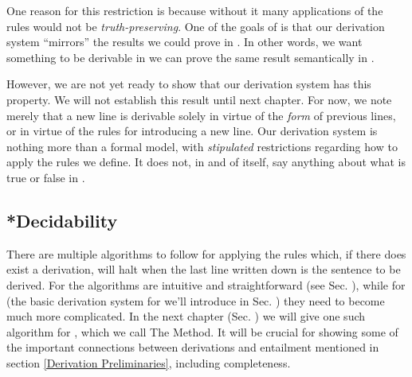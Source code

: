 One reason for this restriction is because without it many applications of the rules would not be \emph{truth-preserving}.  One of the goals of \GSD{} is that our derivation system ``mirrors'' the results we could prove in \GSL{}.  In other words, we want something to be derivable in \GSD{} \Iff we can prove the same result semantically in \GSL{}.

However, we are not yet ready to show that our derivation system has this property.  We will not establish this result until next chapter.  For now, we note merely that a new line is derivable solely in virtue of the \emph{form} of previous lines, or in virtue of the rules for introducing a new line.  Our derivation system is nothing more than a formal model, with \emph{stipulated} restrictions regarding how to apply the rules we define.  It does not, in and of itself, say anything about what is true or false in \GSL{}.

\subsection{*Decidability}\label{Section:Intro to Decidability}
There are multiple algorithms to follow for applying the rules which, if there does exist a derivation, will halt when the last line written down is the sentence to be derived. 
For \GSD{} the algorithms are intuitive and straightforward (see Sec. ), while for \GQD{} (the basic derivation system for \GQL{} we'll introduce in Sec. ) they need to become much more complicated. 
In the next chapter (Sec. ) we will give one such algorithm for \GQD{}, which we call The Method. 
It will be crucial for showing some of the important connections between derivations and entailment mentioned in section \ref{Derivation Preliminaries}, including completeness. 

